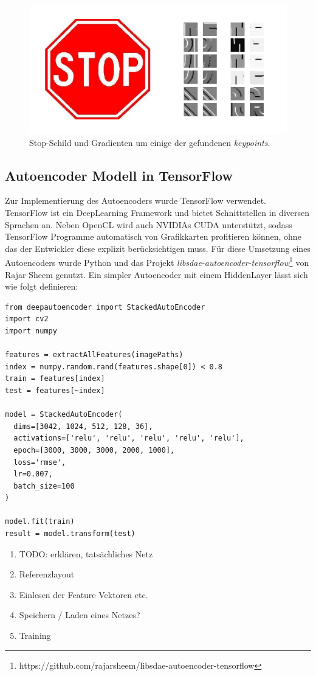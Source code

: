 \begin{figure}
	\centering
	\includegraphics[scale=0.65]{images/gradients_patch.png}
	\caption{Stop-Schild und Gradienten um einige der gefundenen \textit{keypoints}.}
	\label{img:gradients}
\end{figure}

\subsection{Autoencoder Modell in TensorFlow}

Zur Implementierung des Autoencoders wurde TensorFlow verwendet. TensorFlow ist ein DeepLearning Framework und bietet Schnittstellen in diversen Sprachen an. Neben OpenCL wird auch NVIDIAs CUDA unterstützt, sodass TensorFlow Programme automatisch von Grafikkarten profitieren können, ohne das der Entwickler diese explizit berücksichtigen muss. Für diese Umsetzung eines Autoencoders wurde Python und das Projekt \textit{libsdae-autoencoder-tensorflow}\footnote{https://github.com/rajarsheem/libsdae-autoencoder-tensorflow} von Rajar Sheem genutzt. Ein simpler Autoencoder mit einem HiddenLayer lässt sich wie folgt definieren:

\lstset{language=Python}
\begin{lstlisting}
from deepautoencoder import StackedAutoEncoder
import cv2
import numpy

features = extractAllFeatures(imagePaths)
index = numpy.random.rand(features.shape[0]) < 0.8
train = features[index]
test = features[~index]

model = StackedAutoEncoder(
  dims=[3042, 1024, 512, 128, 36],
  activations=['relu', 'relu', 'relu', 'relu', 'relu'], 
  epoch=[3000, 3000, 3000, 2000, 1000], 
  loss='rmse', 
  lr=0.007, 
  batch_size=100
)

model.fit(train)
result = model.transform(test)
\end{lstlisting}

\begin{enumerate}
	\item TODO: erklären, tatsächliches Netz
	\item Referenzlayout
	\item Einlesen der Feature Vektoren etc.
	\item Speichern / Laden eines Netzes?
	\item Training
\end{enumerate}
